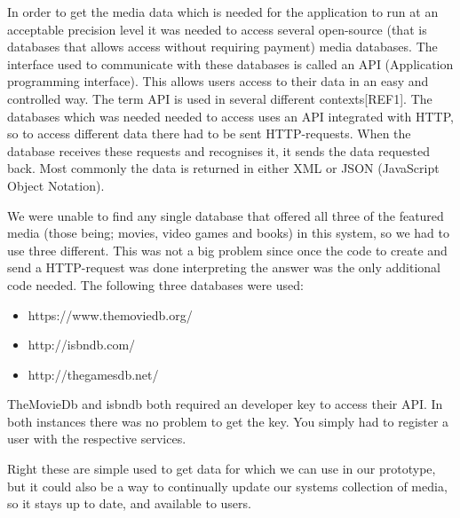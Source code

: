 In order to get the media data which is needed for the application to run at an acceptable precision level it was needed to access several open-source (that is databases that allows access without requiring payment) media databases. The interface used to communicate with these databases is called an API (Application programming interface). This allows users access to their data in an easy and controlled way. The term API is used in several different contexts[REF1]. The databases which was needed needed to access uses an API integrated with HTTP, so to access different data there had to be sent HTTP-requests. When the database receives these requests and recognises it, it sends the data requested back. Most commonly the data is returned in either XML or JSON (JavaScript Object Notation).

We were unable to find any single database that offered all three of the featured media (those being; movies, video games and books) in this system, so we had to use three different. This was not a big problem since once the code to create and send a HTTP-request was done interpreting the answer was the only additional code needed.  The following three databases were used:

\begin{itemize}
	\item https://www.themoviedb.org/
	\item http://isbndb.com/
	\item http://thegamesdb.net/
\end{itemize}

TheMovieDb and isbndb both required an developer key to access their API. In both instances there was no problem to get the key. You simply had to register a user with the respective services. 

Right these are simple used to get data for which we can use in our prototype, but it could also be a way to continually update our systems collection of media, so it stays up to date, and available to users.